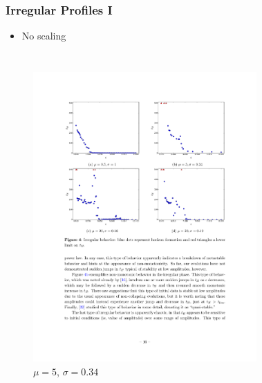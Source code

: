 \documentclass[mathserif,10pt]{beamer}
\newcommand{\bi}{\begin{itemize}}
\newcommand{\ei}{\end{itemize}}
\newcommand{\its}{\item}
\begin{document}
\frame
{
  \frametitle{Irregular Profiles I}
  \bi
  \its No scaling
  \ei
  \begin{columns}
  	\begin{figure}
  	\centering
  	\includegraphics[width=\textwidth]{m5w034} \\ $\mu = 5$, $\sigma = 0.34$
  	\end{figure}
  	\begin{figure}
	\centering

\end{figure}
\end{columns}}
\end{document}

